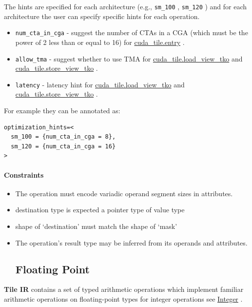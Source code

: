 \documentclass{article}
\begin{document}
The hints are specified for each architecture (e.g., \texttt{sm\_100} , \texttt{sm\_120} ) and for each architecture the user can specify specific hints for each operation.


\begin{itemize}
\item \texttt{num\_cta\_in\_cga} - suggest the number of CTAs in a CGA (which must be the power of 2 less than or equal to 16) for \href{https://docs.nvidia.com/cuda/tile-ir/latest/sections/operations.html#op-cuda-tile-entry}{cuda\_tile.entry} .
\item \texttt{allow\_tma} - suggest whether to use TMA for \href{https://docs.nvidia.com/cuda/tile-ir/latest/sections/operations.html#op-cuda-tile-load-view-tko}{cuda\_tile.load\_view\_tko} and \href{https://docs.nvidia.com/cuda/tile-ir/latest/sections/operations.html#op-cuda-tile-store-view-tko}{cuda\_tile.store\_view\_tko} .
\item \texttt{latency} - latency hint for \href{https://docs.nvidia.com/cuda/tile-ir/latest/sections/operations.html#op-cuda-tile-load-view-tko}{cuda\_tile.load\_view\_tko} and \href{https://docs.nvidia.com/cuda/tile-ir/latest/sections/operations.html#op-cuda-tile-store-view-tko}{cuda\_tile.store\_view\_tko} .

\end{itemize}
For example they can be annotated as:


\begin{lstlisting}
optimization_hints=<
  sm_100 = {num_cta_in_cga = 8},
  sm_120 = {num_cta_in_cga = 16}
>
\end{lstlisting}


\paragraph{Constraints}

\begin{itemize}
\item The operation must encode variadic operand segment sizes in attributes.
\item destination type is expected a pointer type of value type
\item shape of `destination' must match the shape of `mask'
\item The operation's result type may be inferred from its operands and attributes.



\subsection{Floating Point}

\end{itemize}
\textbf{Tile IR} contains a set of typed arithmetic operations which implement familiar arithmetic operations on floating-point types for integer operations see \href{https://docs.nvidia.com/cuda/tile-ir/latest/sections/operations.html#op-group-integer}{Integer} .
\end{document}
